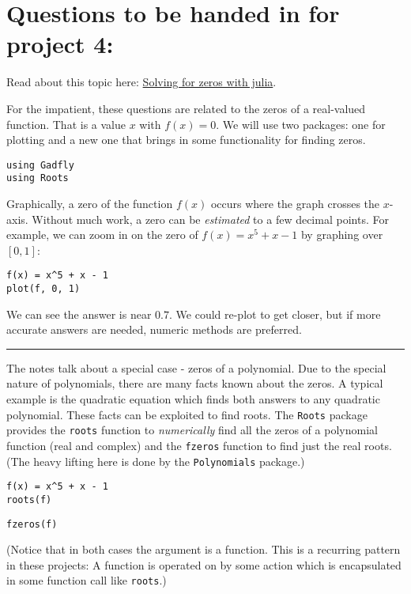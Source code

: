 \documentclass[12pt]{article}
\begin{document}
\section{Questions to be handed in for project 4:}

Read about this topic here:
\href{http://mth229.github.io/zeros.html}{Solving for zeros with julia}.

For the impatient, these questions are related to the zeros of a
real-valued function. That is a value $x$ with $f(x)=0$. We will use two
packages: one for plotting and a new one that brings in some
functionality for finding zeros.



\begin{verbatim}
using Gadfly        
using Roots
\end{verbatim}
Graphically, a zero of the function $f(x)$ occurs where the graph
crosses the $x$-axis. Without much work, a zero can be \emph{estimated}
to a few decimal points. For example, we can zoom in on the zero of
$f(x) = x^5 + x - 1$ by graphing over $[0,1]$:



\begin{verbatim}
f(x) = x^5 + x - 1
plot(f, 0, 1)
\end{verbatim}
We can see the answer is near $0.7$. We could re-plot to get closer, but
if more accurate answers are needed, numeric methods are preferred.

\begin{center}\rule{3in}{0.4pt}\end{center}

The notes talk about a special case - zeros of a polynomial. Due to the
special nature of polynomials, there are many facts known about the
zeros. A typical example is the quadratic equation which finds both
answers to any quadratic polynomial. These facts can be exploited to
find roots. The \texttt{Roots} package provides the \texttt{roots}
function to \emph{numerically} find all the zeros of a polynomial
function (real and complex) and the \texttt{fzeros} function to find
just the real roots. (The heavy lifting here is done by the
\texttt{Polynomials} package.)



\begin{verbatim}
f(x) = x^5 + x - 1
roots(f)
\end{verbatim}


\begin{verbatim}
fzeros(f)
\end{verbatim}
(Notice that in both cases the argument is a function. This is a
recurring pattern in these projects: A function is operated on by some
action which is encapsulated in some function call like \texttt{roots}.)
\end{document}
